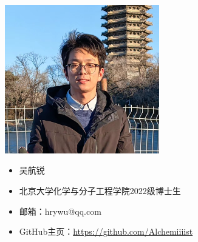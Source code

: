 \begin{figure}[ht]
    \hfill
    \begin{minipage}[c]{0.4\textwidth}
        \includegraphics[width=0.6\textwidth]{./image/author/author-whr.jpg}
    \end{minipage}
    \hfil
    \begin{minipage}[c]{0.5\textwidth}
        \begin{itemize}
            \item 吴航锐
            \item 北京大学化学与分子工程学院2022级博士生
            \item 邮箱：hrywu@qq.com
            \item GitHub主页：\href{https://github.com/Alchemiiiist}{https://github.com/Alchemiiiist}
        \end{itemize}
    \end{minipage}

\end{figure}